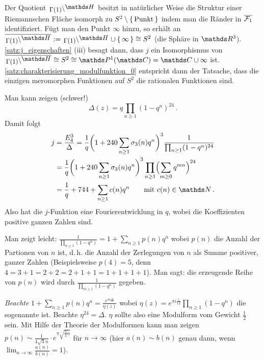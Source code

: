 \begin{beme-list}
	\item Der Quotient $\linksmodulo{\Gamma(1)}{\HH}$ besitzt in natürlicher Weise die Struktur einer Riemannschen Fläche isomorph zu $S^2 \setminus\left\{\,\text{Punkt}\,\right\}$ indem man die Ränder in $\overline{\mathcal{F}_1}$ identifiziert.
	Fügt man den Punkt $\infty$ hinzu, so erhält an $\closure{\linksmodulo{\Gamma(1)}{\HH}} := \linksmodulo{\Gamma(1)}{\HH} \cup \Set{\infty} \cong S^2$ (die Sphäre in $\RR^3$).
	\autoref{satz:j_eigenschaften} (iii) besagt dann, dass $j$ ein Isomorphismus von $\closure{\linksmodulo{\Gamma(1)}{\HH}} \cong S^2 \cong \mathds P^1(\CC) = \CC \cup \infty$ ist.
	\autoref{satz:charakterisierung_modulfunktion_0} entspricht dann der Tatsache, dass die einzigen meromorphen Funktionen auf $S^2$ die rationalen Funktionen sind.
	
	\item Man kann zeigen (schwer!)
	\[
	\Delta(z) = q \prod_{n\geq1} (1-q^n)^{24}
	\,.
	\]
	Damit folgt
	\begin{align*}
	j
	&= \frac{E_4^3}{\Delta}
	= \frac{1}{q} \biggl(1 + 240\sum_{n\geq1} \sigma_3(n)q^n\biggr)^3 \frac{1}{\prod_{n\geq1} (1 - q^n)^{24}} \\
	&= \frac{1}{q} \biggl(1 + 240\sum_{n\geq1} \sigma_3(n)q^n\biggr)^3 \prod_{n\geq1} \Bigl(\sum_{m\geq0} q^{mn}\Bigr)^{24} \\
	&= \frac{1}{q} + 744 + \sum_{n \geq 1} c(n)q^n \qquad \text{mit } c(n) \in \NN
	\,.
	\end{align*}
	Also hat die $j$-Funktion eine Fourierentwicklung in $q$, wobei die Koeffizienten positive ganzen Zahlen sind.
	
	\item Man zeigt leicht: $\frac{1}{\prod_{n\geq1} (1-q^n)} = 1 + \sum_{n\geq1} p(n)q^n$ wobei $p(n)$ die Anzahl der Partionen von $n$ ist, d.\,h. die Anzahl der Zerlegungen von $n$ als Summe positiver, ganzer Zahlen (Beispielsweise $p(4) = 5$, denn $4 = 3 + 1 = 2 + 2 = 2 + 1 + 1 = 1 + 1 + 1 + 1$).
	Man sagt: die erzeugende Reihe von $p(n)$ wird durch $\frac{1}{\prod_{m\geq1} (1-q^n)}$ gegeben.
	
	\emph{Beachte} $1 + \sum_{n\geq1} p(n)q^n = \frac{e^{\pi i\frac{z}{12}}}{\eta(z)}$ wobei $\eta(z) = e^{\pi i\frac{z}{12}} \prod_{n\geq1} (1-q^n)$ die sogenannte  ist.
	Beachte $\eta^{24} = \Delta$.
	$\eta$ sollte also eine Modulform vom Gewicht $\frac{1}{2}$ sein.
	Mit Hilfe der Theorie der Modulformen kann man zeigen $p(n) \sim \frac{1}{4\sqrt 3 n} \cdot e^{\pi \sqrt{\frac{3}{2}n}}$ für $n\to\infty$ (hier $a(n) \sim b(n)$ genau dann, wenn $\lim_{n\to\infty} \frac{a(n)}{b(n)} = 1$).
\end{beme-list}